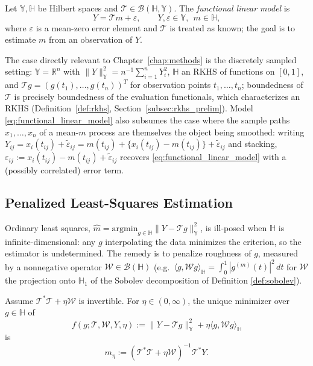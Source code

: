 \begin{definition}
\label{def:functional_linear_model}
Let $\mathbb{Y},\mathbb{H}$ be Hilbert spaces and $\mathcal{T}\in
\mathcal{B}(\mathbb{H},\mathbb{Y})$. The \emph{functional linear model} is
\begin{equation}
Y = \mathcal{T}m + \varepsilon, \qquad Y,\varepsilon\in\mathbb{Y},\ \ m\in
\mathbb{H},
\label{eq:functional_linear_model}
\end{equation}
where $\varepsilon$ is a mean-zero error element and $\mathcal{T}$ is
treated as known; the goal is to estimate $m$ from an observation of $Y$.
\end{definition}

The case directly relevant to Chapter~\ref{chap:methods} is the discretely
sampled setting: $\mathbb{Y}=\mathbb{R}^n$ with $\|Y\|_{\mathbb{Y}}^2 =
n^{-1}\sum_{i=1}^nY_i^2$, $\mathbb{H}$ an RKHS of functions on $[0,1]$,
and $\mathcal{T}g = (g(t_1),\dots,g(t_n))^T$ for observation
points $t_1,\dots,t_n$; boundedness of $\mathcal{T}$ is precisely
boundedness of the evaluation functionals, which characterizes an RKHS
(Definition~\ref{def:rkhs}, Section~\ref{subsec:rkhs_prelim}). Model
\eqref{eq:functional_linear_model} also subsumes the case where the sample
paths $x_1,\dots,x_n$ of a mean-$m$ process are themselves the object being
smoothed: writing $Y_{ij}=x_i(t_{ij})+\widetilde\varepsilon_{ij} =
m(t_{ij}) + \{x_i(t_{ij})-m(t_{ij})\} + \widetilde\varepsilon_{ij}$ and
stacking, $\varepsilon_{ij}:=x_i(t_{ij})-m(t_{ij})+\widetilde\varepsilon_{ij}$
recovers \eqref{eq:functional_linear_model} with a (possibly correlated)
error term.

\subsection{Penalized Least-Squares Estimation}
\label{subsec:penalized_ls}

Ordinary least squares, $\widehat{m}=\mathrm{argmin}_{g\in\mathbb{H}}\|Y-
\mathcal{T}g\|_{\mathbb{Y}}^2$, is ill-posed when $\mathbb{H}$ is
infinite-dimensional: any $g$ interpolating the data minimizes the
criterion, so the estimator is undetermined. The remedy is to penalize
roughness of $g$, measured by a nonnegative operator $\mathcal{W}\in
\mathcal{B}(\mathbb{H})$ (e.g.\ $\langle g,\mathcal{W}g\rangle_{\mathbb{H}}
=\int_0^1|g^{(m)}(t)|^2\,dt$ for $\mathcal{W}$ the projection onto
$\mathbb{H}_1$ of the Sobolev decomposition of Definition
\ref{def:sobolev}).

\begin{theorem}
\label{thm:representer}
Assume $\mathcal{T}^*\mathcal{T}+\eta\mathcal{W}$ is invertible. For
$\eta\in(0,\infty)$, the unique minimizer over $g\in\mathbb{H}$ of
\begin{equation}
f(g;\mathcal{T},\mathcal{W},Y,\eta) := \|Y-\mathcal{T}g\|_{\mathbb{Y}}^2 +
\eta\langle g,\mathcal{W}g\rangle_{\mathbb{H}}
\label{eq:penalized_criterion}
\end{equation}
is
\begin{equation}
m_\eta := (\mathcal{T}^*\mathcal{T}+\eta\mathcal{W})^{-1}\mathcal{T}^*Y.
\label{eq:regularization_estimator}
\end{equation}
\end{theorem}

